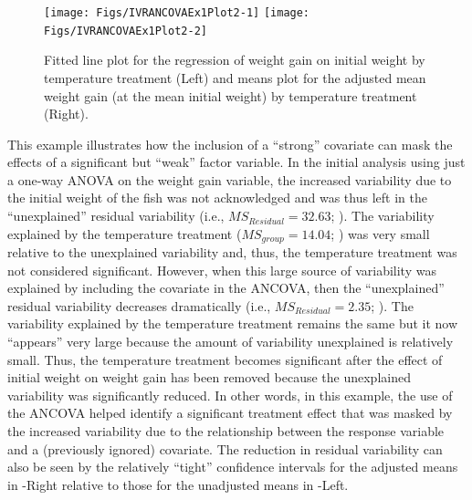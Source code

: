 \documentclass[10pt,openany]{book}\usepackage[]{graphicx}\usepackage[]{color}
\newenvironment{knitrout}{}{} %
\begin{document}
\begin{knitrout}
\color{fgcolor}\begin{figure}[h]

{\centering \texttt{[image: Figs/IVRANCOVAEx1Plot2-1]} 
\texttt{[image: Figs/IVRANCOVAEx1Plot2-2]} 

}

\caption[Fitted line plot for the regression of weight gain on initial weight by temperature treatment (Left) and means plot for the adjusted mean weight gain (at the mean initial weight) by temperature treatment (Right)]{Fitted line plot for the regression of weight gain on initial weight by temperature treatment (Left) and means plot for the adjusted mean weight gain (at the mean initial weight) by temperature treatment (Right).}\label{fig:IVRANCOVAEx1Plot2}
\end{figure}


\end{knitrout}
\vspace{9pt}
This example illustrates how the inclusion of a ``strong'' covariate can mask the effects of a significant but ``weak'' factor variable.  In the initial analysis using just a one-way ANOVA on the weight gain variable, the increased variability due to the initial weight of the fish was not acknowledged and was thus left in the ``unexplained'' residual variability (i.e., $MS_{Residual}=32.63$; ).  The variability explained by the temperature treatment ($MS_{group}=14.04$; ) was very small relative to the unexplained variability and, thus, the temperature treatment was not considered significant.  However, when this large source of variability was explained by including the covariate in the ANCOVA, then the ``unexplained'' residual variability decreases dramatically (i.e., $MS_{Residual}=2.35$; ).  The variability explained by the temperature treatment remains the same but it now ``appears'' very large because the amount of variability unexplained is relatively small.  Thus, the temperature treatment becomes significant after the effect of initial weight on weight gain has been removed because the unexplained variability was significantly reduced.  In other words, in this example, the use of the ANCOVA helped identify a significant treatment effect that was masked by the increased variability due to the relationship between the response variable and a (previously ignored) covariate.  The reduction in residual variability can also be seen by the relatively ``tight'' confidence intervals for the adjusted means in -Right relative to those for the unadjusted means in -Left.
\end{document}
